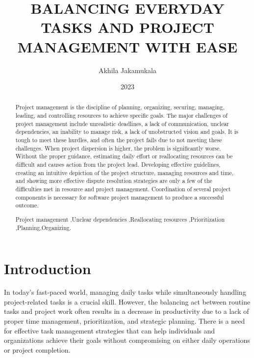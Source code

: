 \documentclass{chart}
\title{BALANCING EVERYDAY TASKS AND PROJECT MANAGEMENT WITH EASE }
\author{Akhila Jakamukala}
\date{2023}
\begin{document}
 
	
\maketitle    %
\begin{abstract}
 Project management is the discipline of planning, organizing, securing, managing, leading, and controlling resources to achieve specific goals. The major challenges of project management include unrealistic deadlines, a lack of communication, unclear dependencies, an inability to manage risk, a lack of unobstructed vision and goals. It is tough to meet these hurdles, and often the project fails due to not meeting these challenges. When project dispersion is higher, the problem is significantly worse. Without the proper guidance, estimating daily effort or reallocating resources can be difficult and causes action from the project lead. Developing effective guidelines, creating an intuitive depiction of the project structure, managing resources and time, and showing more effective dispute resolution strategies are only a few of the difficulties met in resource and project management. Coordination of several project components is necessary for software project management to produce a successful outcome. \\
 	            
\begin{keywords}
 Project management  ,Unclear dependencies ,Reallocating resources ,Prioritization ,Planning,Organizing. 
\end{keywords} 
	
\end{abstract}

\figurespagefalse         
\tablespagefalse           
\makecontents              
 
\section{Introduction}\label{sec:intro}  
In today's fast-paced world, managing daily tasks while simultaneously handling project-related tasks is a crucial skill. However, the balancing act between routine tasks and project work often results in a decrease in productivity due to a lack of proper time management, prioritization, and strategic planning. There is a need for effective task management strategies that can help individuals and organizations achieve their goals without compromising on either daily operations or project completion. 
\end{document}
